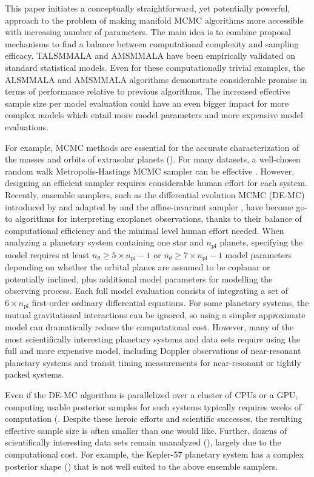 \documentclass[twoside,11pt]{article}
\begin{document}
This paper initiates a conceptually straightforward, yet potentially powerful, approach to the problem of making manifold 
MCMC algorithms more accessible with increasing number of parameters. The main idea is to combine proposal mechanisms to 
find a balance between computational complexity and sampling efficacy. TALSMMALA and AMSMMALA have been empirically 
validated on standard statistical models. Even for these computationally trivial examples, the ALSMMALA and AMSMMALA 
algorithms demonstrate considerable promise in terms of performance relative to previous algorithms. The increased effective 
sample size per model evaluation could have an even bigger impact for more complex models which entail more model parameters 
and more expensive model evaluations.  

For example, MCMC methods are essential for the accurate characterization of the masses and orbits of extrasolar planets 
(\cite{for__qua}). For many datasets, a well-chosen random walk Metropolis-Hastings MCMC sampler can be effective 
\cite{for__im}. However, designing an efficient sampler requires considerable human effort for each system. Recently, 
ensemble samplers, such as the differential evolution MCMC (DE-MC) introduced by \cite{bra__ama} and 
adapted by \cite{nel_for_pay__run} and the affine-invariant sampler \cite{hou_goo_hog__ana, mac_hog_lan__emc}, have become 
go-to algorithms for interpreting exoplanet observations, thanks to their balance of computational efficiency and the 
minimal level human effort needed. When analyzing a planetary system containing one star and $n_{\mathrm{pl}}$ planets, 
specifying the model requires at least $n_{\theta} \ge 5\times n_{\mathrm{pl}}-1$ or
$n_{\theta} \ge 7\times n_{\mathrm{pl}}-1$ model parameters depending on whether the orbital planes are assumed to be 
coplanar or potentially inclined, plus additional model parameters for modelling the observing process. Each full model 
evaluation consists of integrating a set of $6\times n_{\mathrm{pl}}$ first-order ordinary differential equations. For some 
planetary systems, the mutual gravitational interactions can be ignored, so using a simpler approximate model can
dramatically reduce the computational cost. However, many of the most scientifically interesting planetary systems and data 
sets require using the full and more expensive model, including Doppler observations of near-resonant planetary systems and 
transit timing measurements for near-resonant or tightly packed systems.

Even if the DE-MC algorithm is parallelized over a cluster of CPUs or a GPU, computing usable posterior samples for such 
systems typically requires weeks of computation
(\cite{doy_car_fab__kep, car_ago_cha__kep, oro_wel_car__kep, nel_for_wri__the, nel_rob_pay__ane, jon_row_lis__the,
jon_for_row__sec, mil_fab_mig__are}.  
Despite these heroic efforts and scientific successes, the resulting effective sample size is often smaller than one would 
like. Further, dozens of scientifically interesting data sets remain unanalyzed (\cite{hol_maz_nac__tra}), largely due to 
the computational cost. For example, the Kepler-57 planetary system has a complex posterior shape (\cite{jon_for_row__sec}) 
that is not well suited to the above ensemble samplers.
\end{document}
